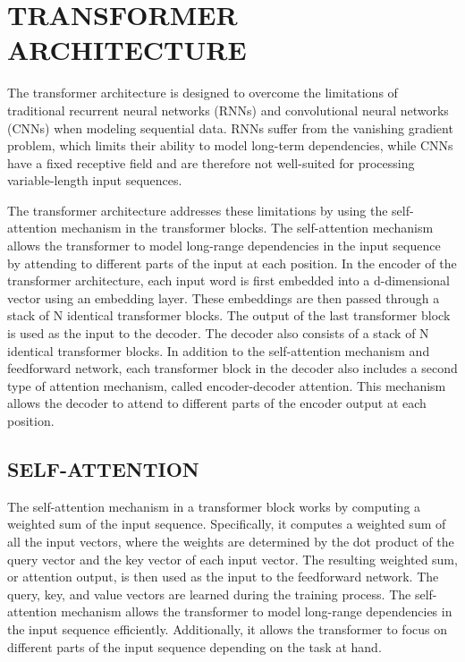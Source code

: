 \documentclass[letterpaper, 10pt, conference]{ieeeconf}
\begin{document}
        \section{TRANSFORMER ARCHITECTURE}

        The transformer architecture is designed to overcome the limitations of traditional recurrent neural networks (RNNs) and convolutional neural networks (CNNs) when modeling sequential data. RNNs suffer from the vanishing gradient problem, which limits their ability to model long-term dependencies, while CNNs have a fixed receptive field and are therefore not well-suited for processing variable-length input sequences\cite{pascasnu2013}.

        The transformer architecture addresses these limitations by using the self-attention mechanism in the transformer blocks.
        The self-attention mechanism allows the transformer to model long-range dependencies in the input sequence by attending to
        different parts of the input at each position.
        In the encoder of the transformer architecture, each input word is first embedded into a d-dimensional vector using an
        embedding layer. These embeddings are then passed through a stack of N identical transformer blocks. The output of the last
        transformer block is used as the input to the decoder.
        The decoder also consists of a stack of N identical transformer blocks. In addition to the self-attention mechanism and
        feedforward network, each transformer block in the decoder also includes a second type of attention mechanism, called encoder-decoder attention. This mechanism allows the decoder to attend to different parts of the encoder output at each position\cite{vaswani2017}.
           
        \subsection{SELF-ATTENTION} 
        
        The self-attention mechanism in a transformer block works by computing a weighted sum of the input sequence. Specifically, it
        computes a weighted sum of all the input vectors, where the weights are determined by the dot product of the query vector and the
        key vector of each input vector.
        The resulting weighted sum, or attention output, is then used as the input to the feedforward network. The query, key,
        and value vectors are learned during the training process.
        The self-attention mechanism allows the transformer to model long-range dependencies in the input sequence efficiently.
        Additionally, it allows the transformer to focus on different parts of the input sequence depending on the task at hand\cite{vaswani2017}.
        
\end{document}

